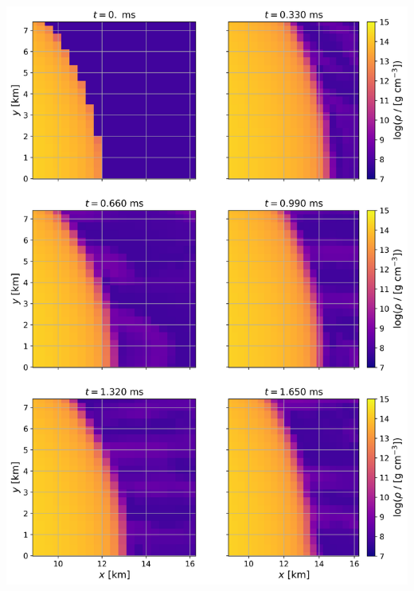 \documentclass[11pt, a4paper]{article}
\begin{document}
\begin{center}
    \centering
    \includegraphics[height=0.9\textheight, width=1\textwidth, keepaspectratio]{images/rho_snapshots.png}
    \label{fig:ns_radial_pulsations}
\end{center}
\end{document}

